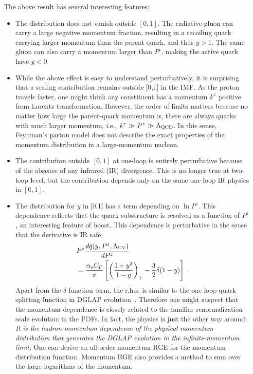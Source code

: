 \documentclass[aps,rmp,reprint,amsmath,amssymb,graphicx,longbibliography]{revtex4-1} %
\begin{document}
The above result has several interesting features:
\begin{itemize}
	\item{The distribution does not vanish outside {$[0,1]$}.
		The radiative gluon can carry a large negative momentum fraction,
		resulting in a recoiling quark carrying larger momentum than the parent quark,
		and thus $y>1$. The same gluon can also carry a momentum larger than $P^z$,
		making the active quark have $y<0$.}
	
	\item{While the above effect is easy to understand perturbatively, it is
		surprising that a scaling contribution remains outside [0,1] in the IMF.
		As the proton travels faster,
		one might think any constituent has a momentum $k^z$ positive from Lorentz
		transformation. However, the order of limits matters because no matter
		how large the parent-quark momentum is, there are always quarks with much larger momentum, i.e.,
		$k^z\gg P^z \gg \Lambda_{\rm QCD}$. In this sense, Feynman's parton model does not describe
		the exact properties of the momentum distribution
		in a large-momentum nucleon.}
	
	\item{The contribution outside $[0,1]$ at one-loop is entirely perturbative because of the
		absence of any infrared (IR) divergence. This is no longer true at two-loop level, but
		the contribution depends only on the same one-loop IR physics in $[0,1]$. }
	
	\item{The distribution for $y$ in [0,1] has a term depending on $\ln P^z$. This dependence
		reflects that the quark substructure is resolved as a function of $P^z$, an interesting
		feature of boost.
		This dependence is perturbative in the sense that the derivative is
		IR safe,
		\begin{align}
			& P^z \frac{d \tilde q(y,P^z,\Lambda_{\rm UV})}{dP^z} \nonumber \\
			&= \frac{\alpha_s C_F}{\pi} \left[\left(\frac{1+y^2}{1-y}\right)_+ -\frac{3}{2}\delta(1-y) \right] \,.
		\end{align}
		Apart from the {$\delta$-function term}, the {r.h.s.} is similar to the one-loop
		quark splitting function in DGLAP evolution~\cite{Dokshitzer:1977sg,Gribov:1972ri,Altarelli:1977zs}. Therefore one might suspect that the momentum
		dependence is closely related to the familiar renormalization scale evolution in the
		PDFs. In fact, the physics is just the other way around: {\it It is the hadron-momentum dependence
			of the physical momentum distribution that generates
			the DGLAP evolution in the infinite-momentum limit.} One can derive an all-order momentum RGE for the momentum distribution function. Momentum RGE also provides a method
		to sum over the large logarithms of the momentum.}
	

\end{itemize}
\end{document}
